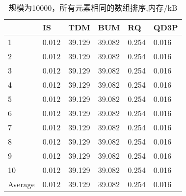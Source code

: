 \documentclass[12pt,a4paper]{ctexart}
\begin{document}
\begin{table}[H]
    \setlength{\abovecaptionskip}{0cm}
    \setlength{\belowcaptionskip}{0.5cm}
    \small
    \centering
    \caption[short]{规模为10000，所有元素相同的数组排序,内存/kB}
    \begin{tabular}{|l|l|l|l|l|l|}
        \hline
                & IS    & TDM    & BUM    & RQ    & QD3P  \\ \hline
        1       & 0.012 & 39.129 & 39.082 & 0.254 & 0.016 \\ \hline
        2       & 0.012 & 39.129 & 39.082 & 0.254 & 0.016 \\ \hline
        3       & 0.012 & 39.129 & 39.082 & 0.254 & 0.016 \\ \hline
        4       & 0.012 & 39.129 & 39.082 & 0.254 & 0.016 \\ \hline
        5       & 0.012 & 39.129 & 39.082 & 0.254 & 0.016 \\ \hline
        6       & 0.012 & 39.129 & 39.082 & 0.254 & 0.016 \\ \hline
        7       & 0.012 & 39.129 & 39.082 & 0.254 & 0.016 \\ \hline
        8       & 0.012 & 39.129 & 39.082 & 0.254 & 0.016 \\ \hline
        9       & 0.012 & 39.129 & 39.082 & 0.254 & 0.016 \\ \hline
        10      & 0.012 & 39.129 & 39.082 & 0.254 & 0.016 \\ \hline
        Average & 0.012 & 39.129 & 39.082 & 0.254 & 0.016 \\ \hline
    \end{tabular}
\end{table}
\end{document}
